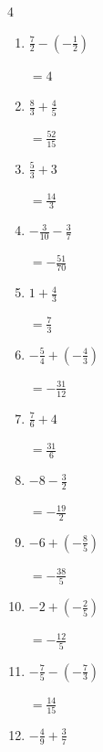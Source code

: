 \begin{multicols}{4}
\begin{enumerate}
\columnbreak %

  \item $\displaystyle \frac{7}{2} - \left(-\frac{1}{2}\right)$

        $\displaystyle =4$

  \item $\displaystyle \frac{8}{3} + \frac{4}{5}$

        $\displaystyle =\frac{52}{15}$

  \item $\displaystyle \frac{5}{3} + 3$

        $\displaystyle =\frac{14}{3}$

  \item $\displaystyle -\frac{3}{10} - \frac{3}{7}$

        $\displaystyle =-\frac{51}{70}$

  \item $\displaystyle 1 + \frac{4}{3}$

        $\displaystyle =\frac{7}{3}$

  \item $\displaystyle -\frac{5}{4} + \left(-\frac{4}{3}\right)$

        $\displaystyle =-\frac{31}{12}$

  \item $\displaystyle \frac{7}{6} + 4$

        $\displaystyle =\frac{31}{6}$

  \item $\displaystyle -8 - \frac{3}{2}$

        $\displaystyle =-\frac{19}{2}$

  \item $\displaystyle -6 + \left(-\frac{8}{5}\right)$

        $\displaystyle =-\frac{38}{5}$

  \item $\displaystyle -2 + \left(-\frac{2}{5}\right)$

        $\displaystyle =-\frac{12}{5}$

\columnbreak %

\resetques

  \item $\displaystyle -\frac{7}{5} - \left(-\frac{7}{3}\right)$

        $\displaystyle =\frac{14}{15}$

  \item $\displaystyle -\frac{4}{9} + \frac{3}{7}$


\end{enumerate}
\end{multicols}
